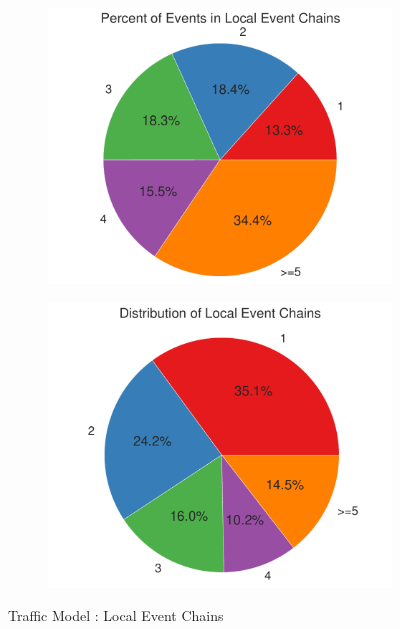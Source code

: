\documentclass[11pt]{book}
\begin{document}
\begin{figure}
    \centering
    \begin{subfigure}{.48\textwidth}
        \centering
        \includegraphics[width=1\textwidth]{figures/local_event_chain/traffic_total.pdf}
    \end{subfigure}
    \begin{subfigure}{.48\textwidth}
        \centering
        \includegraphics[width=1\textwidth]{figures/local_event_chain/traffic_summary.pdf}
    \end{subfigure}
    \caption{Traffic Model : Local Event Chains}
    \label{fig:local_event_chain:traffic}
\end{figure}
\end{document}
